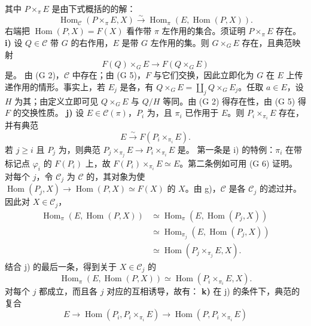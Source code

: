 其中 $P\times_\pi E$ 是由下式概括的的解：
\[\operatorname{Hom}_{\mathcal C}(P\times_\pi E,X)\xrightarrow{\sim}\operatorname{Hom}_\pi(E,\operatorname{Hom}(P,X)).\]
右端把 $\operatorname{Hom}(P,X)=F(X)$ 看作带 $\pi$ 左作用的集合。须证明 $P\times_\pi E$ 存在。
\textbf{i)} 设 $Q\in\mathcal C$ 带 $G$ 的右作用，$E$ 是带 $G$ 左作用的集。则 $G\times_GE$ 存在，且典范映射
\[F(Q)\times_GE\longrightarrow F(Q\times_GE)\]
是。
由 (G 2)，$\mathcal C$ 中存在；由 (G 5)，$F$ 与它们交换，因此立即化为 $G$ 在 $E$ 上传递作用的情形。事实上，若 $E_j$ 是各，有 $Q\times_GE=\coprod_jQ\times_GE_j$。任取 $a\in E$，设 $H$ 为其；由定义立即可见 $Q\times_GE$ 与 $Q/H$ 等同。由 (G 2) 得存在性，由 (G 5) 得 $F$ 的交换性质。
\textbf{j)} 设 $E\in\mathcal C(\pi)$，$P_i$ 为，且 $\pi_i$ 已作用于 $E$。则 $P_i\times_{\pi_i}E$ 存在，并有典范
\[E\xrightarrow{\sim}F(P_i\times_{\pi_i}E).\]
若 $j\geq i$ 且 $P_j$ 为，则典范 $P_j\times_{\pi_j}E\to P_i\times_{\pi_i}E$ 是。
第一条是 i) 的特例：$\pi_i$ 在带标记点 $\varphi_i$ 的 $F(P_i)$ 上，故 $F(P_i)\times_{\pi_i}E\simeq E$。第二条例如可用 (G 6) 证明。
对每个 $j$，令 $\mathcal C_j$ 为 $\mathcal C$ 的，其对象为使 $\operatorname{Hom}(P_j,X)\to\operatorname{Hom}(P,X)\simeq F(X)$ 的 $X$。由 g)，$\mathcal C$ 是各 $\mathcal C_j$ 的滤过并。因此对 $X\in\mathcal C_j$，
\[\begin{aligned}\operatorname{Hom}_\pi(E,\operatorname{Hom}(P,X))&\simeq\operatorname{Hom}_\pi(E,\operatorname{Hom}(P_j,X))\\&\simeq\operatorname{Hom}_{\pi_j}(E,\operatorname{Hom}(P_j,X))\\&\simeq\operatorname{Hom}(P_j\times_{\pi_j}E,X).\end{aligned}\]
结合 j) 的最后一条，得到关于 $X\in\mathcal C_j$ 的
\[\operatorname{Hom}_\pi(E,\operatorname{Hom}(P,X))\simeq\operatorname{Hom}(P_i\times_{\pi_i}E,X).\]
对每个 $j$ 都成立，而且各 $j$ 对应的互相诱导，故有：
\textbf{k)} 在 j) 的条件下，典范的复合
\[E\longrightarrow\operatorname{Hom}(P_i,P_i\times_{\pi_i}E)\longrightarrow\operatorname{Hom}(P,P_i\times_{\pi_i}E)\]
